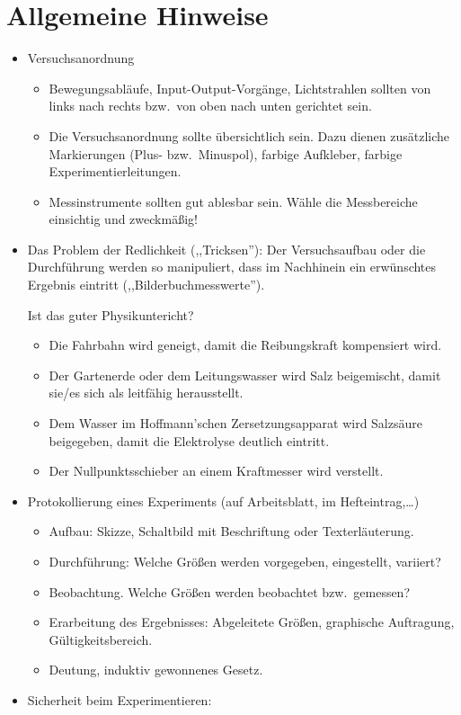 \section{Allgemeine Hinweise}
\begin{itemize}

	\item
	Versuchsanordnung
	\begin{itemize}
		\item
		Bewegungsabl\"{a}ufe, Input-Output-Vorg\"{a}nge, Lichtstrahlen
		sollten von links nach rechts bzw.\ von oben nach unten
		gerichtet sein.
		
		\item
		Die Versuchsanordnung sollte \"{u}bersichtlich sein.
		Dazu dienen zus\"{a}tzliche Markierungen (Plus- bzw.\ Minuspol),
		farbige Aufkleber, farbige Experimentierleitungen.
		\item
		Messinstrumente sollten gut ablesbar sein.
		W\"{a}hle die Messbereiche einsichtig und zweckm\"{a}{\ss}ig!
	\end{itemize}
	
	\item
	Das Problem der Redlichkeit (,,Tricksen''):
	Der Versuchsaufbau oder die Durchf\"{u}hrung werden so
	manipuliert, dass im Nachhinein ein erw\"{u}nschtes Ergebnis
	eintritt (,,Bilderbuchmesswerte'').
	
	Ist das guter Physikuntericht?
	
	\begin{beisp}
	\begin{itemize}
		\item
		Die Fahrbahn wird geneigt, damit die Reibungskraft
		kompensiert wird.
		\item
		Der Gartenerde oder dem Leitungswasser wird Salz beigemischt,
		damit sie/es sich als leitf\"{a}hig herausstellt.
		\item
		Dem Wasser im Hoffmann'schen Zersetzungsapparat wird Salzs\"{a}ure
		beigegeben, damit die Elektrolyse deutlich eintritt.
		\item
		Der Nullpunktsschieber an einem Kraftmesser wird verstellt.
	\end{itemize}
	\end{beisp}
	
	\item
	Protokollierung eines Experiments
	(auf Arbeitsblatt, im Hefteintrag,\dots)
	\begin{itemize}
		\item
		Aufbau: Skizze, Schaltbild mit
		Beschriftung oder Texterl\"{a}uterung.
		\item
		Durchf\"{u}hrung:
		Welche Gr\"{o}{\ss}en werden vorgegeben, eingestellt, variiert?
		\item
		Beobachtung.
		Welche Gr\"{o}{\ss}en werden beobachtet bzw.\ gemessen?
		\item
		Erarbeitung des Ergebnisses: Abgeleitete Gr\"{o}{\ss}en,
		graphische Auftragung, G\"{u}ltigkeitsbereich.
		\item
		Deutung, induktiv gewonnenes Gesetz.
	\end{itemize}
	
	\item
	Sicherheit beim Experimentieren: %
\end{itemize}

